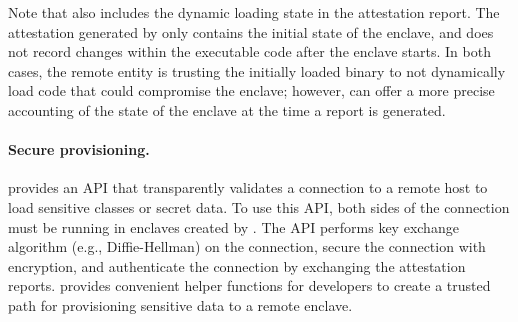 Note that \systemname{} also includes
the dynamic loading state in the attestation report.
The attestation generated by \sgx{} only contains
the initial state of the enclave, and does not record changes within the executable code
after the enclave starts. 
In both cases, the remote entity is trusting the initially loaded binary
to not dynamically load code that could compromise the enclave;
however, \systemname{} can offer a more precise accounting of the state of the enclave 
at the time a report is generated.




\paragraph{Secure provisioning.}
\systemname{} provides an API that transparently validates a connection to a remote host to load
sensitive classes or secret data.
To use this API, both sides of the connection
must be running in enclaves created by \systemname{}.
The API performs key exchange algorithm (e.g., Diffie-Hellman) on the connection,
secure the connection with encryption,
and authenticate the connection by exchanging the attestation reports.
\systemname{} provides convenient helper functions for developers to create a trusted path
for provisioning sensitive data to a remote enclave.



